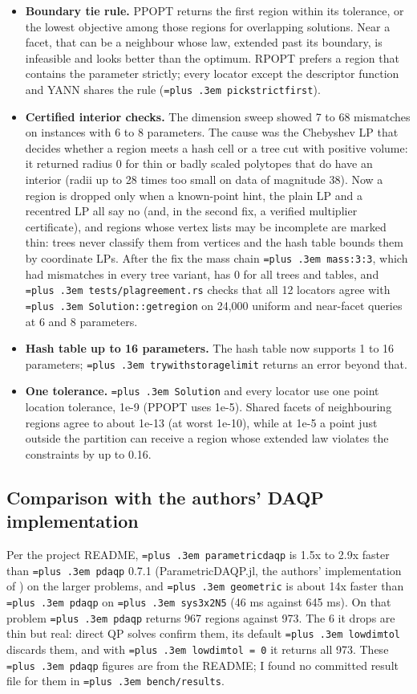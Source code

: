 \documentclass[10pt,a4paper]{article}
\newcommand{\rpopt}{RPOPT}
\newcommand{\ppopt}{PPOPT}
\newcommand{\code}[1]{{\let\_\bu\texttt{\spaceskip=\fontdimen2\font plus .3em #1}}}
\newcommand{\bu}{\textunderscore\hspace{0pt}}
\begin{document}
\begin{itemize}
  \item \textbf{Boundary tie rule.} \ppopt{} returns the first region within its tolerance, or the lowest objective among those regions for overlapping solutions. Near a facet, that can be a neighbour whose law, extended
    past its boundary, is infeasible and looks better than the optimum. \rpopt{} prefers a region that contains the parameter strictly; every locator except the descriptor function and YANN shares the rule (\code{pick\_strict\_first}).
  \item \textbf{Certified interior checks.} The dimension sweep showed 7 to 68 mismatches on instances with 6 to 8 parameters. The cause was the Chebyshev LP that decides whether a region meets a hash cell or a tree cut with positive volume: it
    returned radius 0 for thin or badly scaled polytopes that do have an interior (radii up to 28 times too small on data of magnitude 38). Now a region is dropped only when a known-point hint, the plain LP and a recentred LP all say no (and, in the second fix, a verified multiplier certificate), and regions whose vertex lists may be incomplete are marked thin: trees never classify them
    from vertices and the hash table bounds them by coordinate LPs. After the fix the mass chain \code{mass:3:3}, which had mismatches in every tree variant, has 0 for all trees and tables, and \code{tests/pl\_agreement.rs} checks that all 12 locators agree with \code{Solution::\allowbreak{}get\_region} on
    24,000 uniform and near-facet queries at 6 and 8 parameters.
  \item \textbf{Hash table up to 16 parameters.} The hash table now supports 1 to 16 parameters; \code{try\_with\_storage\_limit} returns an error beyond that.
  \item \textbf{One tolerance.} \code{Solution} and every locator use one point location tolerance, 1e-9 (\ppopt{} uses 1e-5). Shared facets of neighbouring regions agree to about 1e-13 (at worst 1e-10), while at 1e-5 a point just outside the partition can receive a region whose extended law violates the constraints by up to 0.16.
\end{itemize}

\subsection{Comparison with the authors' DAQP implementation}

Per the project README, \code{parametric\_daqp} is 1.5x to 2.9x faster than \code{pdaqp} 0.7.1 (ParametricDAQP.jl, the authors' implementation of \cite{arnstrom2024high}) on the larger problems,
and \code{geometric} is about 14x faster than \code{pdaqp} on \code{sys3x2\_N5} (46 ms against 645 ms). On that problem \code{pdaqp} returns 967 regions against 973. The 6 it drops are thin but real:
direct QP solves confirm them, its default \code{lowdim\_tol} discards them, and with \code{lowdim\_tol = 0} it returns all 973. These \code{pdaqp} figures are from the README; I found no committed result file for them in
\code{bench/results}.
\end{document}

